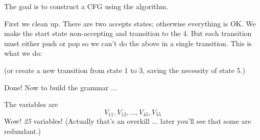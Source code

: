 The goal is to construct a CFG using the algorithm.

First we clean up.
There are two accepts states; otherwise everything is OK.
We make the start state non-accepting and transition to the 4.
But each transition must either push or pop so we can't do the above in a
single transition. 
This is what we do:


\begin{center}
\end{center}

(or create a new transition from state 1 to 3, saving the necessity of state 
5.)

Done! Now to build the grammar ...

The variables are
\[
V_{11}, V_{12}, \ldots, V_{45}, V_{55}
\]
Wow! \textit{ 25} variables! (Actually that's an overkill 
... later you'll see that some are redundant.)

